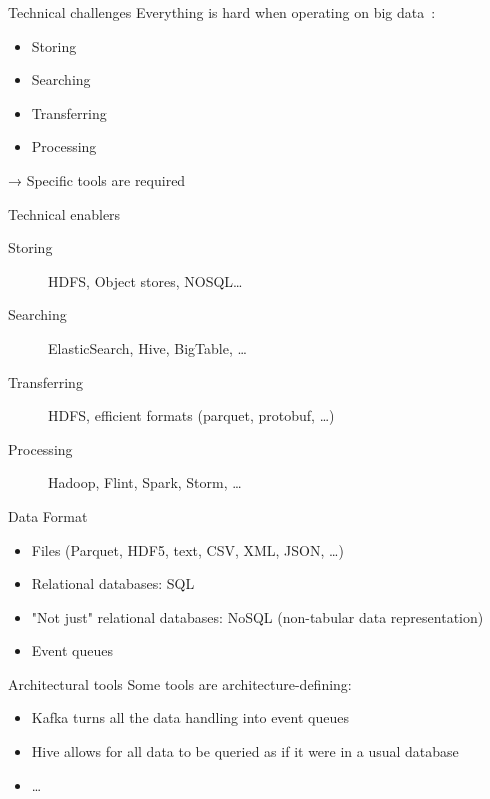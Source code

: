 \begin{frame}{Technical challenges}
  Everything is hard when operating on big data~:

  \begin{itemize}
    \item Storing
    \item Searching
    \item Transferring
    \item Processing
  \end{itemize}

  → Specific tools are required
\end{frame}

\begin{frame}{Technical enablers}
  \begin{description}
    \item[Storing] HDFS, Object stores, NOSQL…
    \item[Searching] ElasticSearch, Hive, BigTable, …
    \item[Transferring] HDFS, efficient formats (parquet, protobuf, …)
    \item[Processing] Hadoop, Flint, Spark, Storm, …
  \end{description}
\end{frame}

\begin{frame}{Data Format}
  \begin{itemize}
    \item Files (Parquet, HDF5, text, CSV, XML, JSON, …)
    \item Relational databases: SQL
    \item "Not just" relational databases: NoSQL (non-tabular data representation)
    \item Event queues
  \end{itemize}
\end{frame}

\begin{frame}{Architectural tools}
  Some tools are architecture-defining:

  \begin{itemize}
    \item Kafka turns all the data handling into event queues
    \item Hive allows for all data to be queried as if it were in a usual database
    \item …
  \end{itemize}
\end{frame}
